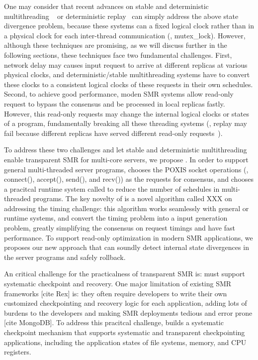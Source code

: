 One may consider that recent advances on stable and deterministic multithreading 
~\cite{dmp:asplos09, coredet:asplos10, dos:osdi10, kendo:asplos09, 
determinator:osdi10, cui:tern:osdi10, dthreads:sosp11, peregrine:sosp11, parrot:sosp13}
or deterministic replay~\cite{rex:eurosys14} can simply address the above state 
divergence problem, because these systems can a fixed logical clock rather than in 
a physical clock for each inter-thread communication (\eg, mutex\_lock).
However, although these techniques are promising, as we will discuss further in the following sections, 
these techniques face two fundamental challenges. First, network delay may 
causes input request to arrive at different replicas at various physical 
clocks, and deterministic/stable multithreading systems have to 
convert these clocks to a consistent logical clocks of these requests in their own schedules. Second, 
to achieve good performance, moden SMR systems allow read-only request to 
bypass the consensus and be processed in local replicas fastly. However, this read-only 
requests may change the internal logical clocks or states of a program, 
fundamentally breaking all these threading systems (\eg, replay may fail 
because different replicas have served different read-only 
requests~\cite{rex:eurosys14, vft:sosp95}).

To address these two challenges and let stable and deterministic 
multithreading enable transparent SMR for multi-core servers, we propose \msmr.
In order to support general multi-threaded server programs, \msmr chooses the 
POXIS socket operations (\eg, connect(), accept(), send(), and recv()) as the 
requests for consensus, and chooses a pracitcal \smt runtime system called 
\parrot to reduce the number of schedules in multi-threaded programs. The key 
novelty of \msmr is a novel algorithm called XXX on addressing the timing 
challenge: this algorithm works seamlessly with general \smt or \dmt runtime systems, 
and convert the timing problem into a input generation problem, greatly simplifying the consensus on 
request timings and have fast performance. To support read-only optimization 
in modern SMR applications, we proposes our new approach that can soundly 
detect internal state divergences in the server programs and safely rollback.

An critical challenge for the practicalness of transparent SMR is: \msmr must 
support systematic checkpoint and recovery. One major limitation of existing SMR 
frameworks [cite Rex] is: they often require developers to write their own 
customized checkpointing and recovery logic for each application, adding lots 
of burdens to the developers and making SMR deployments tedious and 
error prone [cite MongoDB]. To address this pracitcal challenge, \msmr builds a 
systematic checkpoint mechanism that supports systematic and transparent 
checkpointing applications, including the application states of file systems, memory, and CPU registers.


